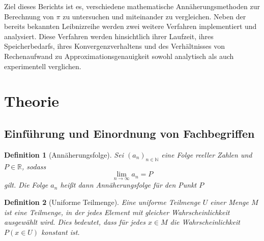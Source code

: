 \documentclass{scrartcl}
\newtheorem{definition}{Definition}
\newtheorem{approximation sequence}{Annäherungsfolge}
\begin{document}
Ziel dieses Berichts ist es, verschiedene mathematische Annäherungsmethoden zur
Berechnung von \(\pi\) zu untersuchen und miteinander zu vergleichen.
Neben der bereits bekannten Leibnizreihe werden zwei weitere Verfahren
implementiert und analysiert.
Diese Verfahren werden hinsichtlich ihrer Laufzeit, ihres Speicherbedarfs,
ihres Konvergenzverhaltens und des Verhältnisses von Rechenaufwand zu
Approximationsgenauigkeit sowohl analytisch als auch experimentell verglichen.


\section{Theorie}

\subsection{Einführung und Einordnung von Fachbegriffen}

\begin{definition}[Annäherungsfolge]
    Sei \((a_n)_{n \in \mathbb{N}}\) eine Folge reeller Zahlen und \(P \in \mathbb{R}\), sodass
    \[\lim_{n \to \infty} a_n = P \] gilt. Die Folge \(a_n\) heißt dann Annäherungsfolge für den Punkt \(P\)

\end{definition}

\begin{definition}[Uniforme Teilmenge]
    Eine uniforme Teilmenge \(U\) einer Menge \(M\) ist eine Teilmenge, in der
    jedes Element mit gleicher Wahrscheinlichkeit ausgewählt wird.
    Dies bedeutet, dass für jedes \(x \in M\) die Wahrscheinlichkeit \(P(x \in U)\)
    konstant ist.
\end{definition}
\end{document}
